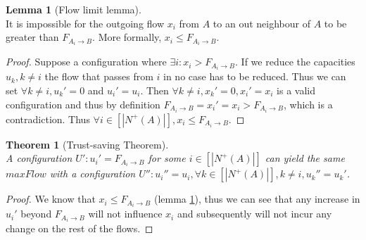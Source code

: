 \documentclass[11pt]{article}
\newtheorem{theorem}{Theorem}[section]
\theoremstyle{definition}
\theoremstyle{corollary}
\newtheorem{corollary}{Corollary}[section]
\theoremstyle{lemma}
\newtheorem{lemma}{Lemma}[section]
\begin{document}

    \begin{lemma}[Flow limit lemma] \ \\
       \label{flowlimit}
       It is impossible for the outgoing flow $x_i$ from $A$ to an out neighbour of $A$ to be greater than
       $F_{A_i \rightarrow B}$. More formally, $x_i \leq F_{A_i \rightarrow B}$.
    \end{lemma}
    \begin{proof}
       Suppose a configuration where $\exists i : x_i > F_{A_i \rightarrow B}$. If we reduce the capacities $u_k, k \neq i$
       the flow that passes from $i$ in no case has to be reduced. Thus we can set $\forall k \neq i, u_k' = 0$ and $u_i' =
       u_i$. Then $\forall k \neq i,x_k' = 0, x_i' = x_i$ is a valid configuration and thus by definition $F_{A_i \rightarrow
       B} = x_i' = x_i > F_{A_i \rightarrow B}$, which is a contradiction. Thus $\forall i \in [|N^{+}(A)|], x_i \leq
       F_{A_i \rightarrow B}$.
    \end{proof}

    \begin{theorem}[Trust-saving Theorem] \ \\
    \label{trustsave}
       A configuration $U' : u_i' = F_{A_i \rightarrow B}$ for some $i \in [|N^{+}(A)|]$ can yield the same $maxFlow$ with a
       configuration $U'' : u_i'' = u_i, \forall k \in [|N^{+}(A)|], k \neq i, u_k'' = u_k'$.
    \end{theorem}
    \begin{proof}
       We know that $x_i \leq F_{A_i \rightarrow B}$ (lemma \ref{flowlimit}), thus we can see that any increase in $u_i'$
       beyond $F_{A_i \rightarrow B}$ will not influence $x_i$ and subsequently will not incur any change on the rest of the
       flows.
    \end{proof}
\end{document}
